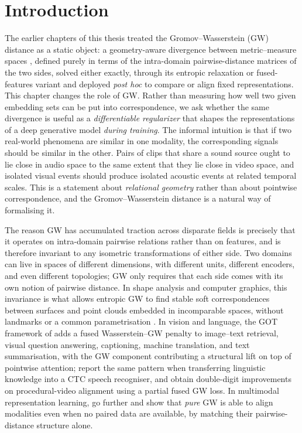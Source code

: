 \section{Introduction}
\label{sec:introduction}

The earlier chapters of this thesis treated the Gromov--Wasserstein
(GW) distance as a static object: a geometry-aware divergence
between metric--measure spaces \citep{memoli_2022_distance},
defined purely in terms of the intra-domain pairwise-distance
matrices of the two sides, solved either exactly, through its
entropic relaxation
\citep{peyre_2016_gromov, solomon_2016_entropic} or fused-features variant \cite{vayer_2019_fused} and deployed \emph{post hoc} to compare or align fixed representations. This
chapter changes the role of GW. Rather than measuring how well
two given embedding sets can be put into correspondence, we ask
whether the same divergence is useful as a \emph{differentiable
regularizer} that shapes the representations of a deep generative
model \emph{during training}. The informal intuition is that 
if two real-world phenomena are similar in one modality, the
corresponding signals should be similar in the other. Pairs of
clips that share a sound source ought to lie close in audio space
to the same extent that they lie close in video space, and
isolated visual events should produce isolated acoustic events at
related temporal scales. This is a statement about
\emph{relational geometry} rather than about pointwise
correspondence, and the Gromov--Wasserstein distance is a natural way of formalising it.

The reason GW has accumulated traction across disparate fields is
precisely that it operates on intra-domain pairwise relations
rather than on features, and is therefore invariant to any
isometric transformations of either side. Two domains can live
in spaces of different dimensions, with different units, different
encoders, and even different topologies; GW only requires that
each side comes with its own notion of pairwise distance. In shape
analysis and computer graphics, this invariance is what allows
entropic GW to find stable soft correspondences between surfaces
and point clouds embedded in incomparable spaces, without
landmarks or a common parametrisation
\citep{peyre_2016_gromov, solomon_2016_entropic}. In vision and
language, the GOT framework of \citet{chen_2020_graph} adds a
fused Wasserstein--GW penalty to image--text retrieval, visual
question answering, captioning, machine translation, and text
summarisation, with the GW component contributing a structural
lift on top of pointwise attention; \citet{lu_2025_crossmodal}
report the same pattern when transferring linguistic knowledge
into a CTC speech recogniser, and \citet{chandra_2025_realign}
obtain double-digit improvements on procedural-video alignment
using a partial fused GW loss. In multimodal representation
learning, \citet{gong_2022_gromov} go further and show that
\emph{pure} GW is able to align modalities even when no paired
data are available, by matching their pairwise-distance structure
alone. 

